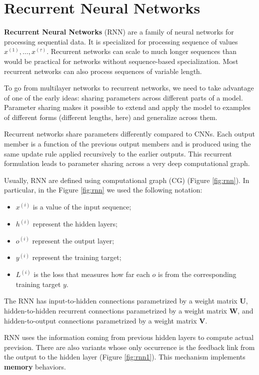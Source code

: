 \chapter{Recurrent Neural Networks}
\textbf{Recurrent Neural Networks} (RNN) are a family of neural networks for
processing sequential data. It is specialized for processing sequence of values
$x^{(1)}, \dots, x^{(\tau)}$. Recurrent networks can scale to much longer sequences
than would be practical for networks without sequence-based specialization. Most
recurrent networks can also process sequences of variable length.

To go from multilayer networks to recurrent networks, we need to take advantage
of one of the early ideas: sharing parameters across different parts of a model.
Parameter sharing makes it possible to extend and apply the model to examples of
different forms (different lengths, here) and generalize across them.

Recurrent networks share parameters differently compared to CNNs. Each output
member is a function of the previous output members and is produced using the
same update rule applied recursively to the earlier outputs. This recurrent
formulation leads to parameter sharing across a very deep computational graph.

Usually, RNN are defined using computational graph (CG) (Figure \ref{fig:rnn}).
In particular, in the Figure \ref{fig:rnn} we used the following notation:
\begin{itemize}
    \item $x^{(i)}$ is a value of the input sequence;
    \item $h^{(i)}$ represent the hidden layers;
    \item $o^{(i)}$ represent the output layer;
    \item $y^{(i)}$ represent the training target;
    \item $L^{(i)}$ is the loss that measures how far each $o$ is from the
          corresponding training target $y$.
\end{itemize}
The RNN has input-to-hidden connections parametrized by a weight matrix $\textbf{U}$,
hidden-to-hidden recurrent connections parametrized by a weight matrix $\textbf{W}$,
and hidden-to-output connections parametrized by a weight matrix $\textbf{V}$.

RNN uses the information coming from previous hidden layers to compute actual
prevision. There are also variants whose only occurrence is the feedback link
from the output to the hidden layer (Figure \ref{fig:rnn1}). This mechanism
implements \textbf{memory} behaviors.


